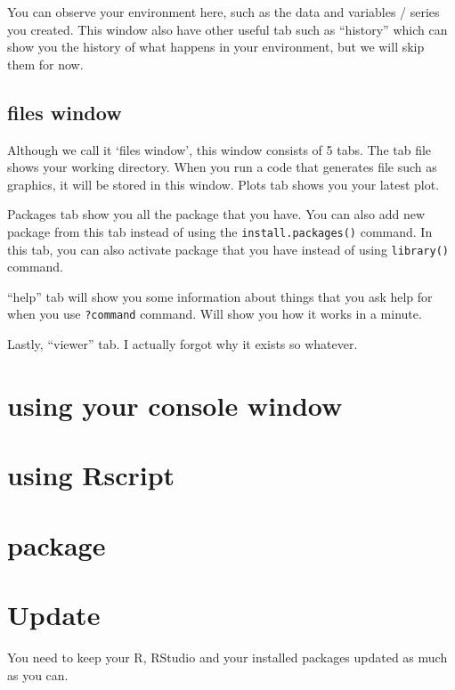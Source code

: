 \documentclass[
]{book}
\begin{document}
You can observe your environment here, such as the data and variables / series you created. This window also have other useful tab such as ``history'' which can show you the history of what happens in your environment, but we will skip them for now.

\hypertarget{files-window}{%
\subsection{files window}\label{files-window}}

Although we call it `files window', this window consists of 5 tabs. The tab file shows your working directory. When you run a code that generates file such as graphics, it will be stored in this window. Plots tab shows you your latest plot.

Packages tab show you all the package that you have. You can also add new package from this tab instead of using the \texttt{install.packages()} command. In this tab, you can also activate package that you have instead of using \texttt{library()} command.

``help'' tab will show you some information about things that you ask help for when you use \texttt{?\textquotesingle{}command\textquotesingle{}} command. Will show you how it works in a minute.

Lastly, ``viewer'' tab. I actually forgot why it exists so whatever.

\hypertarget{using-your-console-window}{%
\section{using your console window}\label{using-your-console-window}}

\hypertarget{using-rscript}{%
\section{using Rscript}\label{using-rscript}}

\hypertarget{package}{%
\section{package}\label{package}}

\hypertarget{update}{%
\section{Update}\label{update}}

You need to keep your R, RStudio and your installed packages updated as much as you can.
\end{document}
